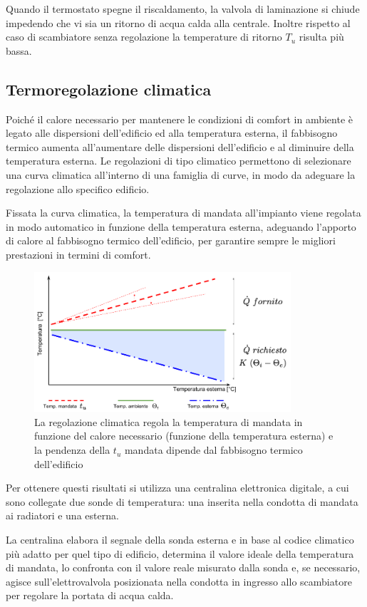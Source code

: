 \documentclass[laurea,oneside,11pt]{USiena_tesiLM}
\begin{document}
Quando il termostato spegne il riscaldamento, la valvola di laminazione si chiude impedendo che vi sia un ritorno di acqua calda alla centrale. Inoltre rispetto al caso di scambiatore senza regolazione la temperature di ritorno $T_u$ risulta più bassa.


\subsection{Termoregolazione climatica}
Poiché il calore necessario per mantenere le condizioni di comfort in ambiente è legato alle dispersioni dell'edificio ed alla temperatura esterna, il fabbisogno termico aumenta all'aumentare delle dispersioni dell'edificio e al diminuire della temperatura esterna. Le regolazioni di tipo climatico permettono di selezionare una curva climatica all'interno di una famiglia di curve, in modo da adeguare la regolazione allo specifico edificio. 

Fissata la curva climatica, la temperatura di mandata all'impianto viene regolata in modo automatico in funzione della temperatura esterna, adeguando l'apporto di calore al fabbisogno termico dell'edificio, per garantire sempre le migliori prestazioni in termini di comfort. 

\begin{figure}[!ht]
\centering
\includegraphics[width=0.85\textwidth]{figure/climatica} 
\caption{La regolazione climatica regola la temperatura di mandata in funzione del calore necessario (funzione della temperatura esterna) e la pendenza della $t_u$ mandata dipende dal fabbisogno termico dell'edificio}
\label{fig:surplus}
\end{figure}

Per ottenere questi risultati si utilizza una centralina elettronica digitale, a cui sono collegate due sonde di temperatura: una inserita nella condotta di mandata ai radiatori e una esterna. 

La centralina elabora il segnale della sonda esterna e in base al codice climatico più adatto per quel tipo di edificio, determina il valore ideale della temperatura di mandata, lo confronta con il valore reale misurato dalla sonda e, se necessario, agisce sull'elettrovalvola posizionata nella condotta in ingresso allo scambiatore per regolare la portata di acqua calda.
\end{document}
